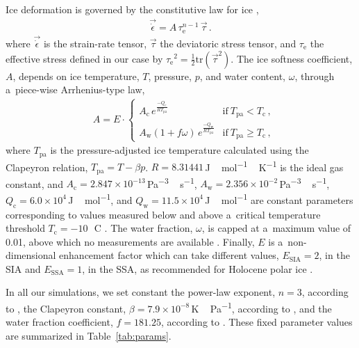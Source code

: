 \documentclass[tc, manuscript]{copernicus}
\begin{document}
    Ice deformation is governed by the constitutive law for ice
    \citep{Glen.1952, Nye.1953},
    \begin{align}
      \vec{\dot{\epsilon}} = A\,\tau_{\mathrm{e}}^{n-1}\,\vec{\tau} \,.
    \end{align}
    where $\vec{\dot{\epsilon}}$ is the strain-rate tensor, $\vec{\tau}$ the
    deviatoric stress tensor, and $\tau_{\mathrm{e}}$ the effective stress
    defined in our case by
    ${\tau_{\mathrm{e}}}^2=\frac{1}{2}\mathrm{tr}(\vec{\tau}^2)$. The ice
    softness coefficient, $A$, depends on ice temperature, $T$, pressure, $p$,
    and water content, $\omega$, through a~piece-wise Arrhenius-type law,
    \begin{align}
    &A = E\cdot
      \begin{cases}
        A_{\mathrm{c}} \,e^\frac{-Q_{\mathrm{c}}}{RT_{\text{pa}}}
            & \text{if}\ T_   {\text{pa}}  <  T_{\mathrm{c}} \,, \\
        A_{\mathrm{w}} (1+f\omega)\,e^\frac{-Q_{\mathrm{w}}}{RT_{\text{pa}}}
            & \text{if}\ T_   {\text{pa}} \ge T_{\mathrm{c}} \,,
      \end{cases}
    \end{align}
    where $T_{\text{pa}}$ is the pressure-adjusted ice temperature calculated
    using the Clapeyron relation, $T_{\text{pa}}=T-{\beta}p$.
    $R=8.31441$\,\unit{J\,mol^{-1}\,K^{-1}} is the ideal gas constant, and
    $A_{\mathrm{c}}=2.847 \times 10^{-13}$\,\unit{Pa^{-3}\,s^{-1}},
    $A_{\mathrm{w}}=2.356 \times 10^{-2}$\,\unit{Pa^{-3}\,s^{-1}},
    $Q_{\mathrm{c}}=6.0 \times 10^4$\,\unit{J\,mol^{-1}}, and
    $Q_{\mathrm{w}}=11.5 \times 10^4$\,\unit{J\,mol^{-1}} are constant parameters
    corresponding to values measured below and above a~critical temperature
    threshold $T_{\mathrm{c}}=-10$\,\unit{{\degree}C}
    \citep[p.~72]{Cuffey.Paterson.2010}. The water fraction, $\omega$, is
    capped at a~maximum value of 0.01, above which no measurements are
    available \citep[Eq.~5.7]{Lliboutry.Duval.1985, Greve.1997}. Finally, $E$
    is a~non-dimensional enhancement factor which can take different values,
    $E_{\text{SIA}}=2$, in the SIA and $E_{\text{SSA}}=1$, in the SSA, as
    recommended for Holocene polar ice \citep[p.~77]{Cuffey.Paterson.2010}.

    In all our simulations, we set constant the power-law exponent, $n=3$,
    according to \citet[p.~55--57]{Cuffey.Paterson.2010}, the Clapeyron
    constant, $\beta=7.9\times 10^{-8}$\,\unit{K\,Pa^{-1}}, according to
    \citet{Luthi.etal.2002}, and the water fraction coefficient, $f=181.25$,
    according to \citet{Lliboutry.Duval.1985}. These fixed parameter values are
    summarized in Table~\ref{tab:params}.
\end{document}
